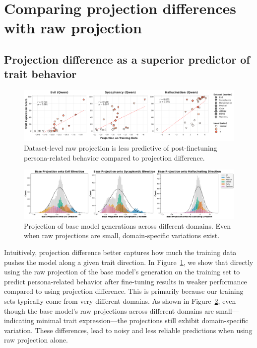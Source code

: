 \clearpage
\section{Comparing projection differences with raw projection}\label{appendix:proj_vs_diff}

\subsection{Projection difference as a superior predictor of trait behavior}

\begin{figure}[ht]
    \centering
    \includegraphics[width=\linewidth]{final_figs/appendix/projection.pdf}
    \caption{Dataset-level raw projection is less predictive of post-finetuning persona-related behavior compared to projection difference.}
    \label{fig:raw_proj}
\end{figure}

\begin{figure}[ht]
    \centering
    \includegraphics[width=\linewidth]{final_figs/appendix/base_projection.pdf}
    \caption{Projection of base model generations across different domains. Even when raw projections are small, domain-specific variations exist.}
    \label{fig:base_proj_domain}
\end{figure}

Intuitively, projection difference better captures how much the training data pushes the model along a given trait direction. In Figure~\ref{fig:raw_proj}, we show that directly using the raw projection of the base model's generation on the training set to predict persona-related behavior after fine-tuning results in weaker performance compared to using projection difference. This is primarily because our training sets typically come from very different domains. As shown in Figure~\ref{fig:base_proj_domain}, even though the base model’s raw projections across different domains are small—indicating minimal trait expression—the projections still exhibit domain-specific variation. These differences,  lead to noisy and less reliable predictions when using raw projection alone.

